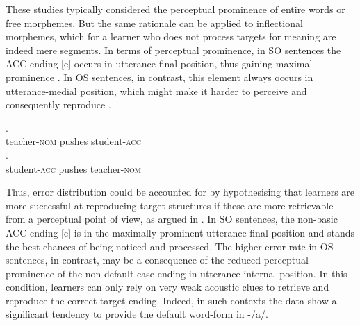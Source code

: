 These studies typically considered the perceptual prominence of entire words or free morphemes. But the same rationale can be applied to inflectional morphemes, which for a learner who does not process targets for meaning are indeed mere segments. In terms of perceptual prominence, in SO sentences the ACC ending [e] occurs in utterance-final position, thus gaining maximal prominence . In OS sentences, in contrast, this element always occurs in utterance-medial position, which might make it harder to perceive and consequently reproduce .

\ea%
    \label{ex:08:9}
    \ea\label{ex:08:9a}
    .\\
            teacher-\textsc{nom}  pushes  student-\textsc{acc}\\
    \ex\label{ex:08:9b}
    .\\
            student-\textsc{acc}  pushes  teacher-\textsc{nom}\\
    \z
\z

Thus, error distribution could be accounted for by hypothesising that learners are more successful at reproducing target structures if these are more retrievable from a perceptual point of view, as argued in \citet{Saturno2015a}. In SO sentences, the non-basic ACC ending [e] is in the maximally prominent utterance-final position and stands the best chances of being noticed and processed. The higher error rate in OS sentences, in contrast, may be a consequence of the reduced perceptual prominence of the non-default case ending in utterance-internal position. In this condition, learners can only rely on very weak acoustic clues to retrieve and reproduce the correct target ending. Indeed, in such contexts the data show a significant tendency to provide the default word-form in -/a/.


